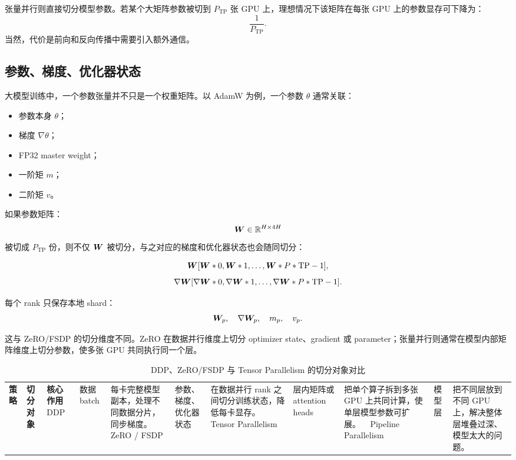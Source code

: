 张量并行则直接切分模型参数。若某个大矩阵参数被切到 $P_{\mathrm{TP}}$ 张 GPU 上，理想情况下该矩阵在每张 GPU 上的参数显存可下降为：
\[
\frac{1}{P_{\mathrm{TP}}}.
\]
当然，代价是前向和反向传播中需要引入额外通信。

\subsection{参数、梯度、优化器状态}
\label{subsec:param-grad-optimizer-states}

大模型训练中，一个参数张量并不只是一个权重矩阵。以 AdamW 为例，一个参数 $\theta$ 通常关联：

\begin{itemize}
\item 参数本身 $\theta$；
\item 梯度 $\nabla \theta$；
\item FP32 master weight；
\item 一阶矩 $m$；
\item 二阶矩 $v$。
\end{itemize}

如果参数矩阵：
\[
\bm{W}\in\mathbb{R}^{H\times 4H}
\]
被切成 $P_{\mathrm{TP}}$ 份，则不仅 $\bm{W}$ 被切分，与之对应的梯度和优化器状态也会随同切分：

\[
\bm{W}
[\bm{W}*0,\bm{W}*1,\ldots,\bm{W}*{P*{\mathrm{TP}}-1}],
\]
\[
\nabla\bm{W}
[\nabla\bm{W}*0,\nabla\bm{W}*1,\ldots,\nabla\bm{W}*{P*{\mathrm{TP}}-1}].
\]

每个 rank 只保存本地 shard：
\[
\bm{W}_p,\quad
\nabla\bm{W}_p,\quad
m_p,\quad
v_p.
\]

这与 ZeRO/FSDP 的切分维度不同。ZeRO 在数据并行维度上切分 optimizer state、gradient 或 parameter；张量并行则通常在模型内部矩阵维度上切分参数，使多张 GPU 共同执行同一个层。

\begin{table}[H]
\centering
\small
\caption{DDP、ZeRO/FSDP 与 Tensor Parallelism 的切分对象对比}
\label{tab:ddp-zero-tp-comparison}
\begin{tabular}{p{}p{}p{}}
\toprule
\textbf{策略} & \textbf{切分对象} & \textbf{核心作用} \
\midrule
DDP
& 数据 batch
& 每卡完整模型副本，处理不同数据分片，同步梯度。 \
\midrule
ZeRO / FSDP
& 参数、梯度、优化器状态
& 在数据并行 rank 之间切分训练状态，降低每卡显存。 \
\midrule
Tensor Parallelism
& 层内矩阵或 attention heads
& 把单个算子拆到多张 GPU 上共同计算，使单层模型参数可扩展。 \
\midrule
Pipeline Parallelism
& 模型层
& 把不同层放到不同 GPU 上，解决整体层堆叠过深、模型太大的问题。 \
\bottomrule
\end{tabular}
\end{table}

